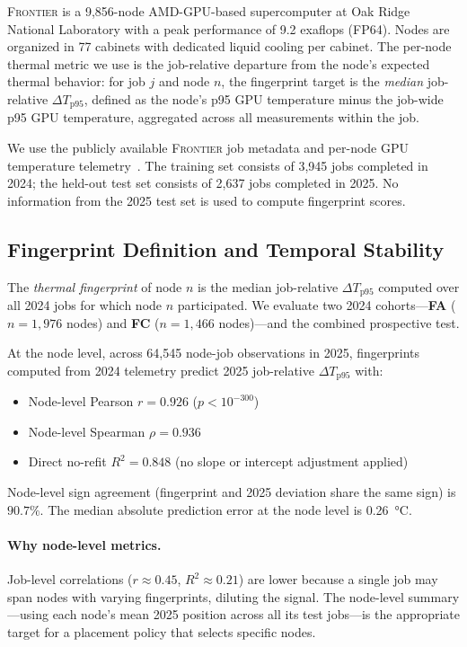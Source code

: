 \documentclass[acmsmall,screen,review,anonymous]{acmart}
\newcommand{\Frontier}{\textsc{Frontier}\xspace}
\begin{document}
\Frontier is a 9,856-node AMD-GPU-based supercomputer at Oak Ridge National Laboratory
with a peak performance of 9.2 exaflops (FP64).  Nodes are organized in 77 cabinets
with dedicated liquid cooling per cabinet.  The per-node thermal metric we use is the
job-relative departure from the node's expected thermal behavior: for job $j$ and
node $n$, the fingerprint target is the \emph{median} job-relative
$\Delta T_{\mathrm{p95}}$, defined as the node's p95 GPU temperature minus the job-wide
p95 GPU temperature, aggregated across all measurements within the job.

We use the publicly available \Frontier job metadata and per-node GPU temperature
telemetry~\cite{frontier_olcf_dataset}.  The training set consists of 3,945 jobs
completed in 2024; the held-out test set consists of 2,637 jobs completed in 2025.
No information from the 2025 test set is used to compute fingerprint scores.

\subsection{Fingerprint Definition and Temporal Stability}

The \emph{thermal fingerprint} of node $n$ is the median job-relative $\Delta T_{\mathrm{p95}}$
computed over all 2024 jobs for which node $n$ participated.  We evaluate two
2024 cohorts---\textbf{FA} ($n=1,976$ nodes) and \textbf{FC} ($n=1,466$ nodes)---and
the combined prospective test.

At the node level, across 64,545 node-job observations in 2025, fingerprints computed
from 2024 telemetry predict 2025 job-relative $\Delta T_{\mathrm{p95}}$ with:
\begin{itemize}
  \item Node-level Pearson $r = 0.926$ ($p < 10^{-300}$)
  \item Node-level Spearman $\rho = 0.936$
  \item Direct no-refit $R^2 = 0.848$ (no slope or intercept adjustment applied)
\end{itemize}
Node-level sign agreement (fingerprint and 2025 deviation share the same sign) is
$90.7\%$.  The median absolute prediction error at the node level is \SI{0.26}{\celsius}.

\paragraph{Why node-level metrics.}
Job-level correlations ($r \approx 0.45$, $R^2 \approx 0.21$) are lower because a
single job may span nodes with varying fingerprints, diluting the signal.  The
node-level summary---using each node's mean 2025 position across all its test
jobs---is the appropriate target for a placement policy that selects specific nodes.
\end{document}

